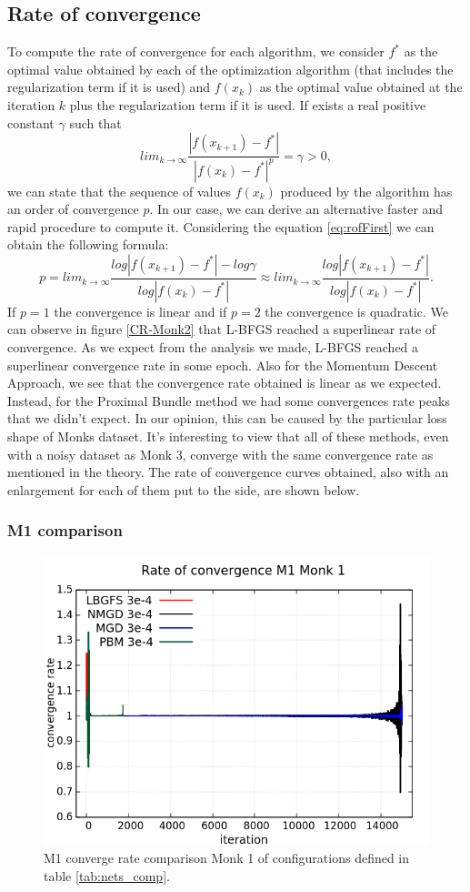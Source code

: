 \subsection{Rate of convergence}
\label{sec:rate_of_convergence}
To compute the rate of convergence for each algorithm, we consider $f^*$ as the optimal value obtained by each of the optimization algorithm (that includes the regularization term if it is used) and $f(x_{k})$ as the optimal value obtained at the iteration $k$ plus the regularization term if it is used. If exists a real positive constant $\gamma$ such that
\begin{equation}
\label{eq:rofFirst}
lim_{k\to \infty}\frac{|f(x_{k+1}) - f^* |}{|f(x_{k}) - f^*|^p} = \gamma > 0,
\end{equation}
we can state that the sequence of values $f(x_{k})$ produced by the algorithm has an order of convergence $p$. In our case, we can derive an alternative faster and rapid procedure to compute it. Considering the equation \ref{eq:rofFirst} we can obtain the following formula: 
\begin{equation}
p = lim_{k\to \infty}\frac{log |f(x_{k+1}) - f^* | - log \gamma}{log|f(x_{k}) - f^*|} \approx lim_{k\to \infty}\frac{log |f(x_{k+1}) - f^* |}{log|f(x_{k}) - f^*|}.
\end{equation}
If $p=1$ the convergence is linear and if $p=2$ the convergence is quadratic. We can observe in figure \ref{CR-Monk2} that L-BFGS reached a superlinear rate of convergence. 
As we expect from the analysis we made, L-BFGS reached a superlinear convergence rate in some epoch. Also for the Momentum Descent Approach, we see that the convergence rate obtained is linear as we expected. Instead, for the Proximal Bundle method we had some convergences rate peaks that we didn't expect. In our opinion, this can be caused by the particular loss shape of Monks dataset.
It's interesting to view that all of these methods, even with a noisy dataset as Monk 3, converge with the same convergence rate as mentioned in the theory. The rate of convergence curves obtained, also with an enlargement for each of them put to the side, are shown below.

\subsubsection{M1 comparison}
\begin{figure}[H]
	\centering
	\includegraphics[width=0.6\linewidth]{data/Comparison/Monk1/Monk1_M1_CR_standard.png}
	\caption{M1 converge rate comparison Monk 1 of configurations defined in table \ref{tab:nets_comp}.}
	\label{fig:CR-M1-Monk1-Standard}
\end{figure}


